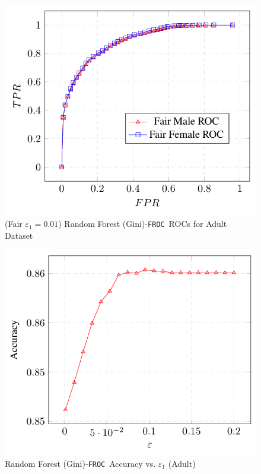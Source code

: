 \documentclass{article}
\newcommand{\ouralgo}{\texttt{FROC}}
\begin{document}
\begin{figure}[!h]
    \centering
    \includegraphics[width=1\linewidth]{Images/RFG_Adult_Baseline_ROC_FROC.png}
    \caption{(Fair $\varepsilon_1 = 0.01$) Random Forest (Gini)-\ouralgo\   ROCs for Adult Dataset}
    \label{fig:RFG_Adult_Baseline_ROC_FROC}
\end{figure}

\begin{figure}[!h]
    \centering
    \includegraphics[width=1\linewidth]{Images/RFG_Adult_Accuracy.png}
    \caption{Random Forest (Gini)-\ouralgo\  Accuracy vs. $\varepsilon_1$ (Adult)}
    \label{fig:RFG_Adult_Accuracy}
\end{figure}
\end{document}
